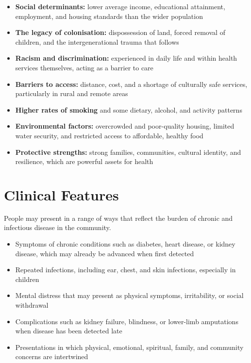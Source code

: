 \begin{itemize}
    \item \textbf{Social determinants:} lower average income, educational attainment, employment, and housing standards than the wider population
    \item \textbf{The legacy of colonisation:} dispossession of land, forced removal of children, and the intergenerational trauma that follows
    \item \textbf{Racism and discrimination:} experienced in daily life and within health services themselves, acting as a barrier to care
    \item \textbf{Barriers to access:} distance, cost, and a shortage of culturally safe services, particularly in rural and remote areas
    \item \textbf{Higher rates of smoking} and some dietary, alcohol, and activity patterns
    \item \textbf{Environmental factors:} overcrowded and poor-quality housing, limited water security, and restricted access to affordable, healthy food
    \item \textbf{Protective strengths:} strong families, communities, cultural identity, and resilience, which are powerful assets for health
\end{itemize}

\section*{Clinical Features}
People may present in a range of ways that reflect the burden of chronic and infectious disease in the community.

\begin{itemize}
    \item Symptoms of chronic conditions such as diabetes, heart disease, or kidney disease, which may already be advanced when first detected
    \item Repeated infections, including ear, chest, and skin infections, especially in children
    \item Mental distress that may present as physical symptoms, irritability, or social withdrawal
    \item Complications such as kidney failure, blindness, or lower-limb amputations when disease has been detected late
    \item Presentations in which physical, emotional, spiritual, family, and community concerns are intertwined
\end{itemize}

